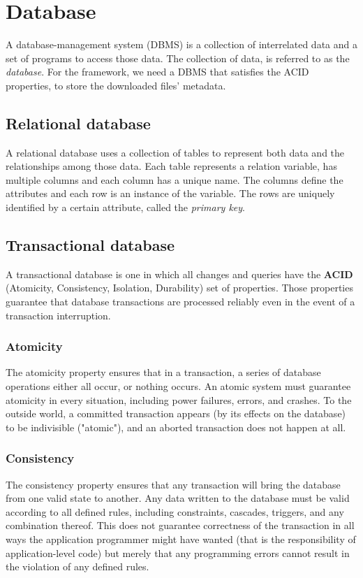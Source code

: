 
\section{Database}
  A database-management system (DBMS) \cite{dbms-sil} is a collection of interrelated data and a set of programs to access those data. The collection of data, is referred to as the \emph{database}. For the framework, we need a DBMS that satisfies the ACID properties, to store the downloaded files' metadata.

  \subsection{Relational database}
    A relational database uses a collection of tables to represent both data and the relationships among those data. Each table represents a relation variable, has multiple columns and each column has a unique name. The columns define the attributes and each row is an instance of the variable. The rows are uniquely identified by a certain attribute, called the \emph{primary key}.

  \subsection{Transactional database}
    A transactional database is one in which all changes and queries have the \textbf{ACID} \cite{acid} (Atomicity, Consistency, Isolation, Durability) set of properties. Those properties guarantee that database transactions are processed reliably even in the event of a transaction interruption.

    \subsubsection{Atomicity}
      The atomicity property ensures that in a transaction, a series of database operations either all occur, or nothing occurs. An atomic system must guarantee atomicity in every situation, including power failures, errors, and crashes. To the outside world, a committed transaction appears (by its effects on the database) to be indivisible ("atomic"), and an aborted transaction does not happen at all.

    \subsubsection{Consistency}
      The consistency property ensures that any transaction will bring the database from one valid state to another. Any data written to the database must be valid according to all defined rules, including constraints, cascades, triggers, and any combination thereof. This does not guarantee correctness of the transaction in all ways the application programmer might have wanted (that is the responsibility of application-level code) but merely that any programming errors cannot result in the violation of any defined rules.

